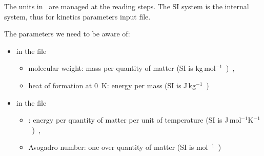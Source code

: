 The units in \antioch\ are managed at the reading
steps. The SI system is the internal system, thus
for kinetics parameters input file.


The parameters we need to be aware of:
\begin{itemize}
\item in the file 
        \begin{itemize}
        \item molecular weight: mass per quantity of matter (SI is \unit{kg\,mol$^{-1}$}),
        \item heat of formation at 0~\unit{K}: energy per mass (SI is \unit{J\,kg$^{-1}$})
        \end{itemize}
\item in the file 
        \begin{itemize}
        \item \Rg: energy per quantity of matter per unit of temperature (SI is \unit{J\,mol$^{-1}$K$^{-1}$}),
        \item Avogadro number: one over quantity of matter (SI is \unit{mol$^{-1}$})
        \end{itemize}
\end{itemize}

